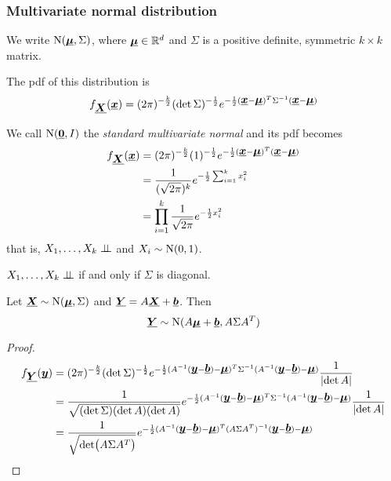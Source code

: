 \documentclass[14pt]{extarticle}
\newcommand{\Normal}{{\operatorfont N}}
\renewcommand{\vec}[1]{\uvec{#1}}
\begin{document}
\subsubsection{Multivariate normal distribution}

We write $\Normal(\vec \mu, \Sigma)$, where $\vec \mu \in \R^d$ and $\Sigma$ is a positive definite, symmetric $k \times k$ matrix.

The pdf of this distribution is
\begin{equation}
    f_{\vec X}(\vec x) = (2 \pi)^{-\frac{k}{2}} (\det \Sigma)^{-\frac{1}{2}} e^{-\frac{1}{2}(\vec x - \vec \mu)^T \Sigma^{-1} (\vec x - \vec \mu)}
\end{equation}

We call $\Normal(\vec 0, I)$ the \emph{standard multivariate normal} and its pdf becomes
\begin{align}
    f_{\vec X}(\vec x) & = (2 \pi)^{-\frac{k}{2}} (1)^{-\frac{1}{2}} e^{-\frac{1}{2}(\vec x - \vec \mu)^T (\vec x - \vec \mu)} \\
                       & = \frac{1}{(\sqrt{2 \pi})^k} e^{-\frac{1}{2} \sum_{i = 1}^k x_i^2}                                    \\
                       & = \prod_{i = 1}^k \frac{1}{\sqrt{2\pi}} e^{-\frac{1}{2}x_i^2}
\end{align}
that is, $X_1, \ldots, X_k \perp \!\!\! \perp$ and $X_i \sim \Normal(0,1)$.

\begin{lemma}
    $X_1, \ldots, X_k \perp \!\!\! \perp$ if and only if $\Sigma$ is diagonal.
\end{lemma}

\begin{proposition}
    Let $\vec X \sim \Normal(\vec \mu, \Sigma)$ and $\vec Y = A \vec X + \vec b$.
    Then
    \begin{equation}
        \vec Y \sim \Normal(A \vec \mu + \vec b, A \Sigma A^T)
    \end{equation}
\end{proposition}

\begin{proof}
    \begin{align}
        f_{\vec Y}(\vec y) & = (2 \pi)^{-\frac{k}{2}} (\det \Sigma)^{-\frac{1}{2}} e^{-\frac{1}{2}(A^{-1}(\vec y - \vec b) - \vec \mu)^T \Sigma^{-1} (A^{-1}(\vec y - \vec b) - \vec \mu)} \frac{1}{\abs{\det A}} \\
                           & = \frac{1}{\sqrt{(\det \Sigma)(\det A)(\det A)}} e^{-\frac{1}{2}(A^{-1}(\vec y - \vec b) - \vec \mu)^T \Sigma^{-1} (A^{-1}(\vec y - \vec b) - \vec \mu)} \frac{1}{\abs{\det A}}      \\
                           & = \frac{1}{\sqrt{\det(A \Sigma A^T)}} e^{-\frac{1}{2}(A^{-1}(\vec y - \vec b) - \vec \mu)^T (A \Sigma A^T)^{-1} (\vec y - \vec b) - \vec \mu)}
    \end{align}
\end{proof}
\end{document}
